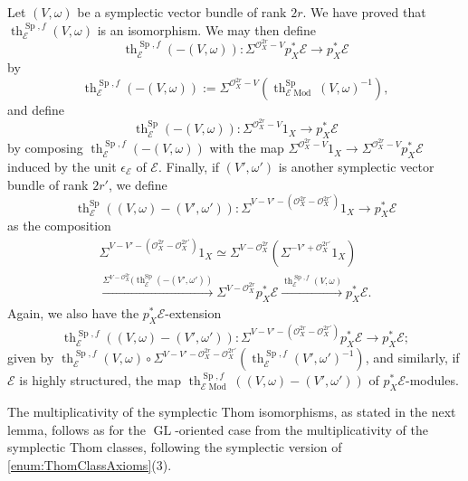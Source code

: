 \documentclass[10pt]{amsart}
\theoremstyle{definition}
\theoremstyle{plain}
\numberwithin{equation}{section}
\newcommand{\0}{\emptyset}
\newcommand{\sE}{{\mathcal E}}
\newcommand{\sO}{{\mathcal O}}
\newcommand{\GL}{{\operatorname{GL}}}
\newcommand{\Sp}{{\operatorname{Sp}}}
\renewcommand{\th}{{\operatorname{th}}}
\newcommand{\Mod}{{\operatorname{Mod}}}
\begin{document}
Let $(V,\omega)$ be a symplectic vector bundle of rank $2r$. We have proved that $\th^{\Sp,f}_{\sE}(V,\omega)$ is an isomorphism. We may then define 
\[
\th^{\Sp,f}_{\sE}(-(V,\omega)):\Sigma^{\sO_X^{2r}-V}p_X^*\sE\to p_X^*\sE
\]
by
\[
\th^{\Sp,f}_{\sE}(-(V,\omega)):=\Sigma^{\sO_X^{2r}-V}(\th^{\Sp}_{\sE\Mod}(V,\omega)^{-1}),
\]
and define
\[
\th^{\Sp}_{\sE}(-(V,\omega)):\Sigma^{\sO_X^{2r}-V}1_X\to p_X^*\sE
\]
by composing $\th^{\Sp,f}_{\sE}(-(V,\omega))$ with the map $\Sigma^{\sO_X^{2r}-V}1_X\to
\Sigma^{\sO_X^{2r}-V}p_X^*\sE$ induced by the unit $\epsilon_\sE$ of $\sE$. Finally, if $(V',\omega')$ is another symplectic vector bundle of rank $2r'$, we define
\[
\th^{\Sp}_{\sE}((V,\omega)-(V',\omega')):\Sigma^{V-V'- (\sO_X^{2r}-\sO_X^{2r'})}1_X\to p_X^*\sE
\]
as the composition
\begin{multline*}
\Sigma^{V-V'- (\sO_X^{2r}-\sO_X^{2r'})}1_X\simeq
\Sigma^{V- \sO_X^{2r}}(\Sigma^{-V'+ \sO_X^{2r'}}1_X)\\\xrightarrow{\Sigma^{V- \sO_X^{2r}}(\th^{\Sp}_{\sE}(-(V',\omega'))}
\Sigma^{V- \sO_X^{2r}}p_X^*\sE\xrightarrow{\th^{\Sp,f}_{\sE}(V,\omega)}
p_X^*\sE.
\end{multline*}
Again, we also have the $p_X^*\sE$-extension
\[
\th^{\Sp,f}_{\sE}((V,\omega)-(V',\omega')):\Sigma^{V-V'- (\sO_X^{2r}-\sO_X^{2r'})}p^*_X\sE\to p_X^*\sE;
\]
given by 
$\th^{\Sp,f}_{\sE}(V,\omega)\circ \Sigma^{V-V'-\sO_X^{2r}-\sO_X^{2r'}}(\th^{\Sp,f}_{\sE}(V',\omega')^{-1})$, and similarly, if $\sE$ is highly structured, the map $\th^{\Sp, f}_{\sE\Mod}((V,\omega)-(V',\omega'))$ of $p_X^*\sE$-modules.

The multiplicativity of the symplectic Thom isomorphisms, as stated in the next lemma, follows as for the $\GL$-oriented case from the multiplicativity of the symplectic Thom classes, following the symplectic version of  \eqref{enum:ThomClassAxioms}(3).
\end{document}
